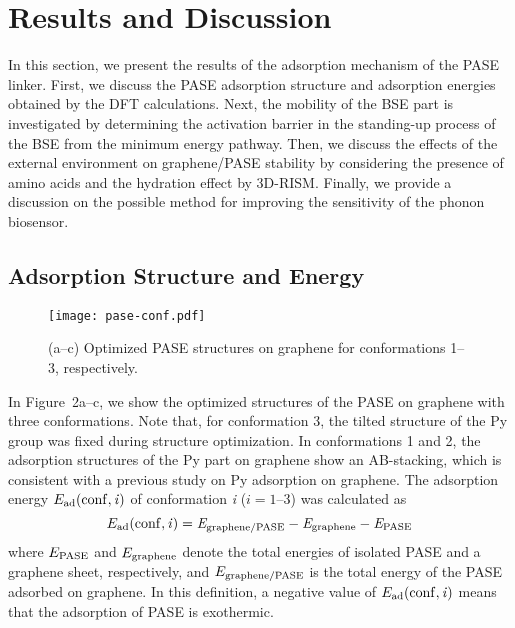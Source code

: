 \documentclass[journal=acsodf,manuscript=article]{achemso}
\begin{document}
\section{Results and Discussion}

In this section, we present the results of the adsorption mechanism of the PASE linker.
First, we discuss the PASE adsorption structure and adsorption energies obtained by the DFT calculations.
Next, the mobility of the BSE part is investigated by determining the activation barrier in the standing-up process of the BSE from the minimum energy pathway. Then, we discuss the effects of the external environment on graphene/PASE stability by considering the presence of amino acids and the hydration effect by 3D-RISM. Finally, we provide a discussion on the possible method for improving the sensitivity of the phonon biosensor.

\subsection{Adsorption Structure and Energy}

\begin{figure}[t]
    \centering
    \texttt{[image: pase-conf.pdf]}
    \caption{(a--c) Optimized PASE structures on graphene for conformations 1--3, respectively.}
    \label{fig:pase-conf}
\end{figure} 

\indent In Figure\ 2a--c, we show the optimized structures of the PASE on graphene with three conformations. Note that, for conformation 3, the tilted structure of the Py group was fixed during structure optimization. In conformations 1 and 2, the adsorption structures of the Py part on graphene show an AB-stacking, which is consistent with a previous study on Py adsorption on graphene\cite{bailey2014study}. The adsorption energy $E_{\rm ad}(\rm conf,\it i)$ of conformation {\it i} ($i = 1$--$3$) was calculated as
\begin{equation}
E_{\rm ad}(\rm conf,\it i) =  E_{\rm graphene/PASE} - E_{\rm graphene} - E_{\rm PASE}
\end{equation}where $E_{\rm PASE}$ and $E_{\rm graphene}$ denote the total energies of isolated PASE and a graphene sheet, respectively, and $E_{\rm graphene/PASE}$ is the total energy of the PASE adsorbed on graphene. In this definition, a negative value of $E_{\rm ad}(\rm conf,\it i)$ means that the adsorption of PASE is exothermic.
\end{document}
